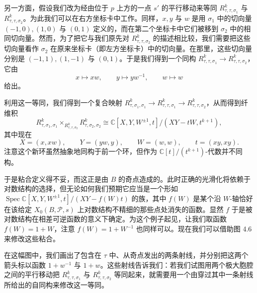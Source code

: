 另一方面，假设我们改为经由位于 $p$ 上方的一点 $s'$ 的平行移动来等同 $R_{\tau,\tau,\sigma_1}^k$ 与 $R_{\tau,\tau,\sigma_2}^k$。为此我们可以在右方坐标卡中工作。同样，$x,y$ 与 $w$ 是用 $\sigma_1$ 中的切向量 $(-1,0),(1,0)$ 与 $(0,1)$ 定义的，而在第二个坐标卡中它们被移到 $\sigma_2$ 中的相同切向量。然而，为了把它与我们原先对 $R_{\tau,\tau,\sigma_2}^k$ 的描述相比较，我们需要把这些切向量看作 $\sigma_2$ 在原来坐标卡（即左方坐标卡）中的切向量。在那里，这些切向量分别是 $(-1,1),(1,-1)$ 与 $(0,1)$。于是我们得到一个同构 $R_{\tau,\tau,\sigma_1}^k\to R_{\tau,\tau,\sigma_2}^k$，它由
\begin{equation}
x\mapsto xw,\qquad y\mapsto yw^{-1},\qquad w\mapsto w \tag{4.10.1}
\end{equation}
给出。

利用这一等同，我们得到一个复合映射 $R_{\tau,\sigma_1,\sigma_1}^k\to R_{\tau,\tau,\sigma_1}^k\to R_{\tau,\tau,\sigma_2}^k$，从而得到纤维积
\[
R_{\tau,\sigma_1,\sigma_1}^k\times_{R_{\tau,\tau,\sigma_2}^k}R_{\tau,\sigma_2,\sigma_2}^k\cong\mathbb{C}[X,Y,W^{\pm1},t]/(XY-tW,t^{k+1}),
\]
其中现在
\[
X=(x,xw),\qquad Y=(yw,y),\qquad W=(w,w),\qquad t=(xy,xy).
\]
注意这个新环虽然抽象地同构于前一个环，但作为 $\mathbb{C}[t]/(t^{k+1})$-代数并不同构。

于是粘合定义得不妥，而这正是由 $B$ 的奇点造成的。此时正确的光滑化将依赖于对数结构的选择，但无论如何我们预期它应当是一个形如 $\operatorname{Spec}\mathbb{C}[X,Y,W^{\pm1},t]/(XY-f(W)t)$ 的族，其中 $f(W)$ 是某个沿 $W$-轴恰好在该给定 $X_0(B,\mathcal{P},s)$ 上对数结构不精细的那些点处消失的函数。显然 $f$ 于是被对数结构在相差可逆函数的意义下确定。为这个例子起见，让我们取函数 $f(W)=1+W$，注意 $f(W)=1+W^{-1}$ 也同样可以。现在我们可以借助图 4.6 来修改这些粘合。

在这幅图中，我们画出了包含在 $\tau$ 中、从奇点发出的两条射线，并分别把这两个箭头标以函数 $1+w^{-1}$ 与 $1+w$。这些射线告诉我们：若我们试图用两个极大胞腔之间的平行移动把 $R_{\tau,\tau,\sigma_1}^k$ 与 $R_{\tau,\tau,\sigma_2}^k$ 等同起来，就需要用一个由穿过其中一条射线所给出的自同构来修改这一等同。
